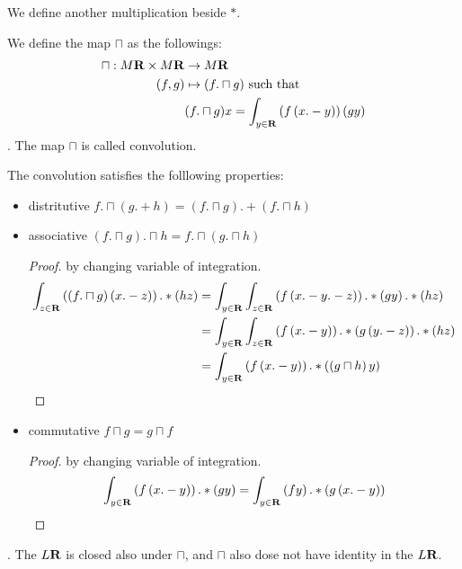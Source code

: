 We define another multiplication beside $*$.
\begin{definition}[Convolution]
We define the map $\sqcap$ as the followings:
\begin{equation}\begin{split}
	\sqcap: M{\mathbf{R}}\times M{\mathbf{R}} &\to M{\mathbf{R}} \\
	(f,g) &\mapsto (f.\sqcap g) \text{ such that} \\
	& (f.\sqcap g)x = \int_{y\in{\mathbf{R}}}\left({f\left({x.-y}\right)}\right)\left({gy}\right) \\
\end{split}\end{equation}
. The map $\sqcap$ is called convolution.
\end{definition}
The convolution satisfies the folllowing properties:
\begin{itemize}
\item distritutive $f.\sqcap(g.+ h) = (f.\sqcap g).+ (f.\sqcap h)$
\item associative $(f.\sqcap g).\sqcap h = f.\sqcap(g.\sqcap h)$
	\begin{proof}
		by changing variable of integration.
		\begin{equation*}\begin{split}
			\int_{{z}\in{\mathbf{R}}}\left({\left({f.\sqcap g}\right)\left({x.-z}\right)}\right).*\left({hz}\right)
				&= \int_{{y}\in{\mathbf{R}}}\int_{{z}\in{\mathbf{R}}}\left({f\left({x.-y.-z}\right)}\right).*\left({gy}\right).*\left({hz}\right) \\
				&= \int_{{y}\in{\mathbf{R}}}\int_{{z}\in{\mathbf{R}}}\left({f\left({x.-y}\right)}\right).*\left({g\left({y.-z}\right)}\right).*\left({hz}\right) \\
				&= \int_{{y}\in{\mathbf{R}}}\left({f\left({x.-y}\right)}\right).*\left({\left({g\sqcap h}\right)y}\right) \\
		\end{split}\end{equation*}
	\end{proof}
\item commutative $f\sqcap g = g\sqcap f$
	\begin{proof}
		by changing variable of integration.
		\begin{equation*}\begin{split}
			\int_{{y}\in{\mathbf{R}}}\left({f\left({x.-y}\right)}\right).*\left({gy}\right)
			&= \int_{{y}\in{\mathbf{R}}}\left({fy}\right).*\left({g\left({x.-y}\right)}\right) \\
		\end{split}\end{equation*}
	\end{proof}
\end{itemize}
.
The $L{\mathbf{R}}$ is closed also under $\sqcap$, and $\sqcap$ also dose not
have identity in the $L{\mathbf{R}}$.

